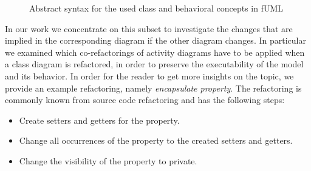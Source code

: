 \documentclass{llncs}
\begin{document}
\begin{figure}[h!t]
 \centering
 \caption{Abstract syntax for the used class and behavioral concepts in fUML}
 \label{fig:fuml1}
\end{figure}

In our work we concentrate on this subset to investigate the changes that are implied in the corresponding
diagram if the other diagram changes. In particular we examined which co-refactorings of activity diagrams 
have to be applied when a class diagram is refactored, in order to preserve the executability of the model 
and its behavior. In order for the reader to get more insights on the topic, we provide an example refactoring, namely \textit{encapsulate property}. 
The refactoring is commonly known from source code refactoring and has the following steps:

\begin{itemize}
 \item Create setters and getters for the property.
 \item Change all occurrences of the property to the created setters and getters.
 \item Change the visibility of the property to private.
\end{itemize}
\end{document}
